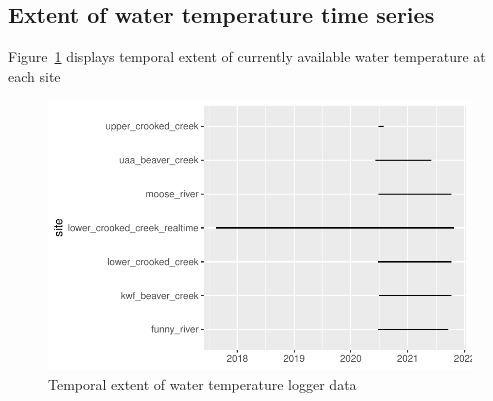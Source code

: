 \documentclass[
  letterpaper,
  DIV=11,
  numbers=noendperiod]{scrreprt}
\begin{document}
\hypertarget{extent-of-water-temperature-time-series}{%
\subsection{Extent of water temperature time
series}\label{extent-of-water-temperature-time-series}}

Figure~\ref{fig-extent-fig} displays temporal extent of currently
available water temperature at each site

\begin{figure}

{\centering \includegraphics{./temp_logger_data_prep_files/figure-pdf/fig-extent-fig-1.pdf}

}

\caption{\label{fig-extent-fig}Temporal extent of water temperature
logger data}

\end{figure}
\end{document}
